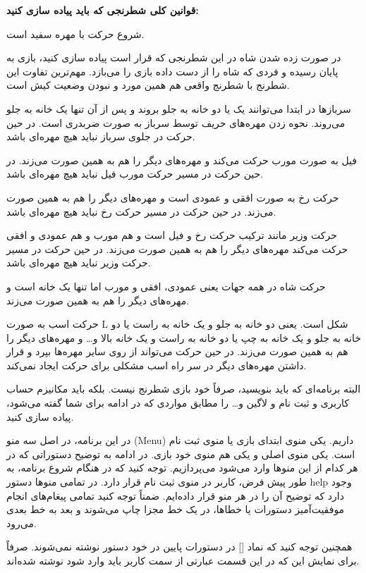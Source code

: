 \documentclass[]{article}
\begin{document}
\textbf{قوانین کلی شطرنجی که باید پیاده سازی کنید:}

شروع حرکت با مهره سفید است.

در صورت زده شدن شاه در این شطرنجی که قرار است پیاده سازی کنید، بازی به پایان رسیده و فردی که شاه را از دست داده بازی را می‌بازد. مهم‌ترین تفاوت این شطرنج با شطرنج واقعی هم همین مورد و نبودن وضعیت کیش است.

سربازها در ابتدا می‌توانند یک یا دو خانه به جلو بروند و پس از آن تنها یک خانه به جلو می‌روند. نحوه زدن مهره‌های حریف توسط سرباز به صورت ضربدری است. در حین حرکت در جلوی سرباز نباید هیچ مهره‌ای باشد.

فیل به صورت مورب حرکت می‌کند و مهره‌های دیگر را هم به همین صورت می‌زند. در حین حرکت در مسیر حرکت مورب فیل نباید هیچ مهره‌ای باشد.

حرکت رخ به صورت افقی و عمودی است و مهره‌های دیگر را هم به همین صورت می‌زند. در حین حرکت در مسیر حرکت رخ نباید هیچ مهره‌ای باشد.

حرکت وزیر مانند ترکیب حرکت رخ و فیل است و هم مورب و هم عمودی و افقی حرکت می‌کند مهره‌های دیگر را هم به همین صورت می‌زند. در حین حرکت در مسیر حرکت وزیر نباید هیچ مهره‌ای باشد.

حرکت شاه در همه جهات یعنی عمودی، افقی و مورب اما تنها یک خانه است و مهره‌های دیگر را هم به همین صورت می‌زند.

حرکت اسب به صورت L شکل است. یعنی دو خانه به جلو و یک خانه به راست یا دو خانه به جلو و یک خانه به چپ یا دو خانه به راست و یک خانه بالا و… و مهره‌های دیگر را هم به همین صورت می‌زند. در حین حرکت می‌تواند از روی سایر مهره‌ها بپرد و قرار داشتن مهره‌های دیگر در سر راه اسب مشکلی برای حرکت ایجاد نمی‌کند.


البته برنامه‌ای که باید بنویسید، صرفاً خود بازی شطرنج نیست. بلکه باید مکانیزم حساب کاربری و ثبت نام و لاگین و… را مطابق مواردی که در ادامه برای شما گفته می‌شود، پیاده سازی کنید.

\hrulefill

در این برنامه، در اصل سه منو (Menu) داریم. یکی منوی ابتدای بازی یا منوی ثبت نام است. یکی منوی اصلی و یکی هم منوی خود بازی. در ادامه به توضیح دستوراتی که در هر کدام از این منوها وارد می‌شود می‌پردازیم. توجه کنید که در هنگام شروع برنامه، به طور پیش فرض، کاربر در منوی ثبت نام قرار دارد. در تمامی منوها دستور help وجود دارد که توضیح آن را در هر منو قرار داده‌ایم. ضمناً توجه کنید تمامی پیغام‌های انجام موفقیت‌آمیز دستورات یا خطاها، در یک خط مجزا چاپ می‌شوند و بعد به خط بعدی می‌رود.

همچنین توجه کنید که نماد [] در دستورات پایین در خود دستور نوشته نمی‌شوند. صرفاً برای نمایش این که در این قسمت عبارتی از سمت کاربر باید وارد شود نوشته شده‌اند.
\end{document}
